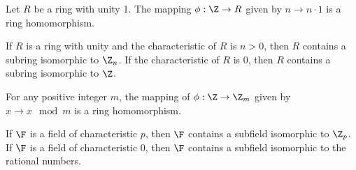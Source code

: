 \begin{theorem}
	Let $R$ be a ring with unity 1. The mapping $\phi: \Z \to R$ given by $n \to n \cdot 1$ is a ring homomorphism.
\end{theorem}

\begin{corollary}
	If $R$ is a ring with unity and the characteristic of $R$ is $n > 0$, then $R$ contains a subring isomorphic to $\Z_n$. If the characteristic of $R$ is 0, then $R$ contains a subring isomorphic to $\Z$.
\end{corollary}

\begin{corollary}
	For any positive integer $m$, the mapping of $\phi: \Z \to \Z_m$ given by $x \to x \mod m$ is a ring homomorphism.
\end{corollary}

\begin{corollary}
	If $\F$ is a field of characteristic $p$, then $\F$ contains a subfield isomorphic to $\Z_p$. If $\F$ is a field of characteristic 0, then $\F$ contains a subfield isomorphic to the rational numbers.
\end{corollary}
